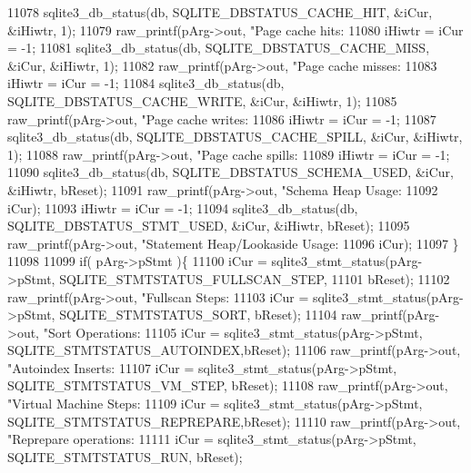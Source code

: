 \begin{DoxyCode}
{{{{{{{{{{{{{{{{{{{11078     sqlite3_db_status(db, SQLITE_DBSTATUS_CACHE_HIT, &iCur, &iHiwtr, 1);
11079     raw_printf(pArg->out, \textcolor{stringliteral}{"Page cache hits:                     %
11080     iHiwtr = iCur = -1;
11081     sqlite3_db_status(db, SQLITE_DBSTATUS_CACHE_MISS, &iCur, &iHiwtr, 1);
11082     raw_printf(pArg->out, \textcolor{stringliteral}{"Page cache misses:                   %
11083     iHiwtr = iCur = -1;
11084     sqlite3_db_status(db, SQLITE_DBSTATUS_CACHE_WRITE, &iCur, &iHiwtr, 1);
11085     raw_printf(pArg->out, \textcolor{stringliteral}{"Page cache writes:                   %
11086     iHiwtr = iCur = -1;
11087     sqlite3_db_status(db, SQLITE_DBSTATUS_CACHE_SPILL, &iCur, &iHiwtr, 1);
11088     raw_printf(pArg->out, \textcolor{stringliteral}{"Page cache spills:                   %
11089     iHiwtr = iCur = -1;
11090     sqlite3_db_status(db, SQLITE_DBSTATUS_SCHEMA_USED, &iCur, &iHiwtr, bReset);
11091     raw_printf(pArg->out, \textcolor{stringliteral}{"Schema Heap Usage:                   %
11092             iCur);
11093     iHiwtr = iCur = -1;
11094     sqlite3_db_status(db, SQLITE_DBSTATUS_STMT_USED, &iCur, &iHiwtr, bReset);
11095     raw_printf(pArg->out, \textcolor{stringliteral}{"Statement Heap/Lookaside Usage:      %
11096             iCur);
11097   \}
11098 
11099   \textcolor{keywordflow}{if}( pArg->pStmt )\{
11100     iCur = sqlite3_stmt_status(pArg->pStmt, SQLITE_STMTSTATUS_FULLSCAN_STEP,
11101                                bReset);
11102     raw_printf(pArg->out, \textcolor{stringliteral}{"Fullscan Steps:                      %
11103     iCur = sqlite3_stmt_status(pArg->pStmt, SQLITE_STMTSTATUS_SORT, bReset);
11104     raw_printf(pArg->out, \textcolor{stringliteral}{"Sort Operations:                     %
11105     iCur = sqlite3_stmt_status(pArg->pStmt, SQLITE_STMTSTATUS_AUTOINDEX,bReset);
11106     raw_printf(pArg->out, \textcolor{stringliteral}{"Autoindex Inserts:                   %
11107     iCur = sqlite3_stmt_status(pArg->pStmt, SQLITE_STMTSTATUS_VM_STEP, bReset);
11108     raw_printf(pArg->out, \textcolor{stringliteral}{"Virtual Machine Steps:               %
11109     iCur = sqlite3_stmt_status(pArg->pStmt, SQLITE_STMTSTATUS_REPREPARE,bReset);
11110     raw_printf(pArg->out, \textcolor{stringliteral}{"Reprepare operations:                %
11111     iCur = sqlite3_stmt_status(pArg->pStmt, SQLITE_STMTSTATUS_RUN, bReset);
}}}}}}}}}}}}}}}}}}}}}}}}}}}}}}
\end{DoxyCode}
